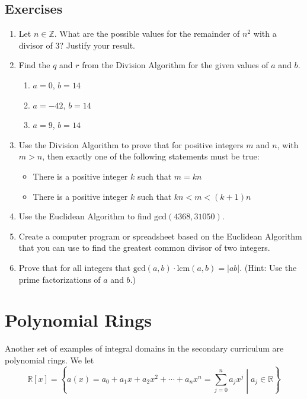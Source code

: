 \documentclass[
]{book}
\providecommand{\tightlist}{%
  \setlength{\itemsep}{0pt}\setlength{\parskip}{0pt}}
\theoremstyle{definition}
\theoremstyle{definition}
\theoremstyle{definition}
\theoremstyle{remark}
\begin{document}
\hypertarget{exercises-23}{%
\subsection{Exercises}\label{exercises-23}}

\begin{enumerate}
\def\labelenumi{\arabic{enumi}.}
\item
  Let \(n\in \mathbb{Z}\). What are the possible values for the remainder of \(n^2\) with a divisor of \(3\)? Justify your result.
\item
  Find the \(q\) and \(r\) from the Division Algorithm for the given values of \(a\) and \(b\).

  \begin{enumerate}
  \def\labelenumii{\alph{enumii}.}
  \tightlist
  \item
    \(a=0\), \(b=14\)
  \item
    \(a=-42\), \(b=14\)
  \item
    \(a=9\), \(b=14\)
  \end{enumerate}
\item
  Use the Division Algorithm to prove that for positive integers \(m\) and \(n\), with \(m > n\), then exactly one of the following statements must be true:

  \begin{itemize}
  \tightlist
  \item
    There is a positive integer \(k\) such that \(m = kn\)
  \item
    There is a positive integer \(k\) such that \(kn < m < (k + 1)n\)
  \end{itemize}
\item
  Use the Euclidean Algorithm to find \(\mathrm{gcd}(4368,31050)\).
\item
  Create a computer program or spreadsheet based on the Euclidean Algorithm that you can use to find the greatest common divisor of two integers.
\item
  Prove that for all integers that \(\mathrm{gcd}(a,b)\cdot \mathrm{lcm}(a,b) = |ab|\). (Hint: Use the prime factorizations of \(a\) and \(b\).)
\end{enumerate}

\hypertarget{polynomial-rings}{%
\section{Polynomial Rings}\label{polynomial-rings}}

Another set of examples of integral domains in the secondary curriculum are polynomial rings. We let \[\mathbb{R}[x]= \left\{ a(x)=a_0 + a_1 x + a_2 x^2 + \cdots + a_n x^n =\sum_{j=0}^n a_j x^j  \middle \vert a_j \in \mathbb{R} \right\}\]
\end{document}
